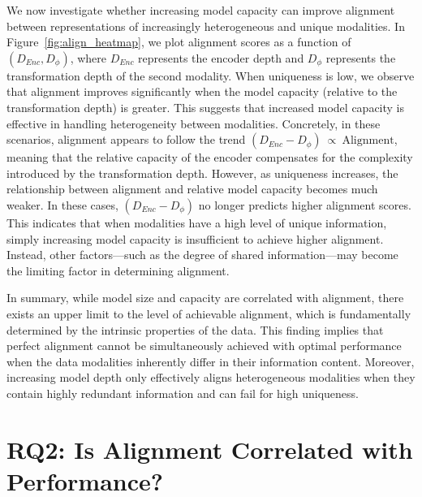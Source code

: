 We now investigate whether increasing model capacity can improve alignment between representations of increasingly heterogeneous and unique modalities. In Figure~\ref{fig:align_heatmap}, we plot alignment scores as a function of \((D_{Enc}, D_{\phi})\), where \(D_{Enc}\) represents the encoder depth and \(D_{\phi}\) represents the transformation depth of the second modality. When uniqueness is low, we observe that alignment improves significantly when the model capacity (relative to the transformation depth) is greater. This suggests that increased model capacity is effective in handling heterogeneity between modalities. Concretely, in these scenarios, alignment appears to follow the trend \((D_{Enc} - D_{\phi})~\propto~\mathrm{Alignment}\), meaning that the relative capacity of the encoder compensates for the complexity introduced by the transformation depth. However, as uniqueness increases, the relationship between alignment and relative model capacity becomes much weaker. In these cases, \((D_{Enc} - D_{\phi})\) no longer predicts higher alignment scores. This indicates that when modalities have a high level of unique information, simply increasing model capacity is insufficient to achieve higher alignment. Instead, other factors—such as the degree of shared information—may become the limiting factor in determining alignment.

In summary, while model size and capacity are correlated with alignment, there exists an upper limit to the level of achievable alignment, which is fundamentally determined by the intrinsic properties of the data. This finding implies that perfect alignment cannot be simultaneously achieved with optimal performance when the data modalities inherently differ in their information content. Moreover, increasing model depth only effectively aligns heterogeneous modalities when they contain highly redundant information and can fail for high uniqueness.

\section{RQ2: Is Alignment Correlated with Performance?}
\label{sec:align_perf}


